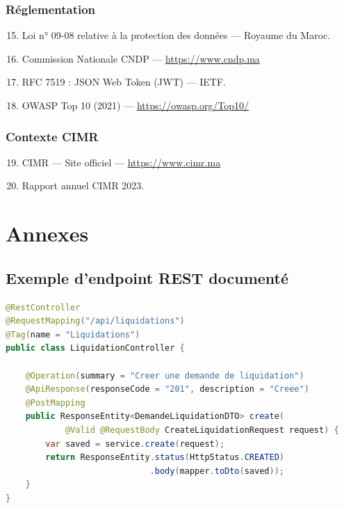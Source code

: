 \documentclass[12pt,a4paper,oneside]{report}
\begin{document}
\subsection*{Réglementation}
\begin{enumerate}\setcounter{enumi}{14}
    \item Loi n° 09-08 relative à la protection des données --- Royaume du Maroc.
    \item Commission Nationale CNDP --- \url{https://www.cndp.ma}
    \item RFC 7519 : JSON Web Token (JWT) --- IETF.
    \item OWASP Top 10 (2021) --- \url{https://owasp.org/Top10/}
\end{enumerate}

\subsection*{Contexte CIMR}
\begin{enumerate}\setcounter{enumi}{18}
    \item CIMR --- Site officiel --- \url{https://www.cimr.ma}
    \item Rapport annuel CIMR 2023.
\end{enumerate}

\appendix
\chapter{Annexes}

\section{Exemple d'endpoint REST documenté}
\begin{lstlisting}[language=Java]
@RestController
@RequestMapping("/api/liquidations")
@Tag(name = "Liquidations")
public class LiquidationController {

    @Operation(summary = "Creer une demande de liquidation")
    @ApiResponse(responseCode = "201", description = "Creee")
    @PostMapping
    public ResponseEntity<DemandeLiquidationDTO> create(
            @Valid @RequestBody CreateLiquidationRequest request) {
        var saved = service.create(request);
        return ResponseEntity.status(HttpStatus.CREATED)
                             .body(mapper.toDto(saved));
    }
}
\end{lstlisting}
\end{document}

